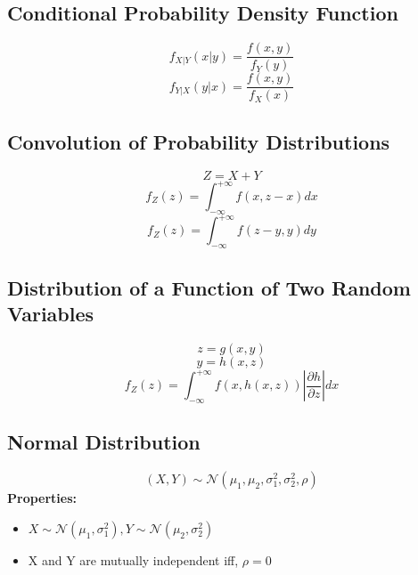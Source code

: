 \documentclass{article}
\begin{document}
\subsection{Conditional Probability Density Function}
\[
    f_{X|Y}(x|y) = \frac{f(x,y)}{f_Y(y)}
\]
\[
    f_{Y|X}(y|x) = \frac{f(x,y)}{f_X(x)}
\]

\subsection{Convolution of Probability Distributions}
\[
    Z = X + Y
\]
\[
    f_Z(z) = \int_{-\infty}^{+\infty} f(x,z-x)dx
\]
\[
    f_Z(z) = \int_{-\infty}^{+\infty} f(z-y,y)dy
\]

\subsection{Distribution of a Function of Two Random Variables}
\[
    z=g(x,y)
\]
\[
    y=h(x,z)
\]
\[
    f_Z(z) = \int_{-\infty}^{+\infty} f(x,h(x,z)) \left| \frac{\partial h}{\partial z} \right| dx
\]

\subsection{Normal Distribution}
\[ (X,Y) \sim \mathcal{N}(\mu_1, \mu_2, \sigma_1^2, \sigma_2^2, \rho) \]
\textbf{Properties:}
\begin{itemize}
    \item \( X \sim \mathcal{N}(\mu_1, \sigma_1^2), Y \sim \mathcal{N}(\mu_2, \sigma_2^2) \)
    \item X and Y are mutually independent iff, \( \rho = 0 \)
\end{itemize}
\end{document}
